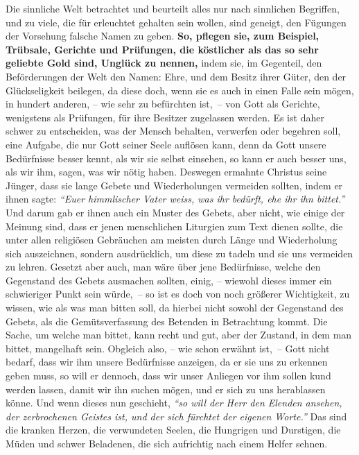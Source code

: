 \medskip

\label{ref:06_13_auf_die_probe_gestellt}
Die sinnliche Welt betrachtet und beurteilt alles nur nach sinnlichen
Begriffen, und zu viele, die für erleuchtet
gehalten sein wollen, sind
geneigt, den Fügungen der Vorsehung falsche Namen zu geben.
\textbf{So, pflegen
sie, zum
Beispiel, Trübsale, Gerichte und Prüfungen, die köstlicher
als das so sehr
geliebte Gold sind, Unglück zu nennen,} indem sie, im
Gegenteil, den
Beförderungen der Welt den Namen: Ehre, und dem Besitz ihrer Güter, den der
Glückseligkeit beilegen, da diese doch, wenn sie es auch
in einen Falle sein
mögen, in hundert anderen, -- wie sehr zu befürchten ist,~-- von Gott als
Gerichte, wenigstens als Prüfungen, für ihre Besitzer zugelassen
werden. Es ist
daher schwer zu entscheiden, was der Mensch behalten, verwerfen oder begehren
soll, eine Aufgabe, die nur Gott seiner Seele auflösen
kann, denn da Gott unsere
Bedürfnisse besser kennt, als wir sie
selbst einsehen, so kann er auch besser
uns, als wir ihm, sagen, was wir nötig haben. Deswegen ermahnte Christus seine
Jünger, dass sie lange Gebete und Wiederholungen vermeiden sollten, indem er
ihnen sagte:
\textit{"`Euer himmlischer Vater weiss, was ihr bedürft, ehe ihr ihn
bittet."'}
Und darum gab er ihnen auch ein Muster des
Gebets, aber nicht, wie einige der Meinung sind, dass er jenen menschlichen
Liturgien zum Text dienen sollte, die unter allen religiösen Gebräuchen am
meisten durch Länge und Wiederholung sich auszeichnen, sondern ausdrücklich,
um diese zu tadeln und sie uns vermeiden zu lehren. Gesetzt aber auch, man wäre
über jene Bedürfnisse, welche den Gegenstand des Gebets ausmachen sollten,
einig, -- wiewohl dieses immer ein schwieriger Punkt sein würde,~-- so ist es
doch von noch größerer Wichtigkeit, zu wissen, wie als was man bitten soll, da
hierbei nicht sowohl der Gegenstand des Gebets, als die Gemütsverfassung des
Betenden in Betrachtung kommt. Die Sache, um welche man bittet, kann recht und
gut, aber der Zustand, in dem man bittet, mangelhaft sein. Obgleich also, -- wie
schon erwähnt ist,~-- Gott nicht bedarf, dass wir ihm unsere Bedürfnisse
anzeigen, da er sie uns zu erkennen geben muss, so will er dennoch, dass wir
unser Anliegen vor ihm sollen kund werden lassen, damit wir ihn suchen mögen,
und er sich zu uns herablassen könne. Und wenn dieses nun geschieht,
\textit{"`so will der Herr den Elenden ansehen, der zerbrochenen Geistes ist,
und der sich fürchtet der eigenen Worte."'}
Das sind die kranken Herzen, die
verwundeten Seelen, die Hungrigen und Durstigen, die Müden
und schwer Beladenen,
die sich aufrichtig nach einem Helfer sehnen.

